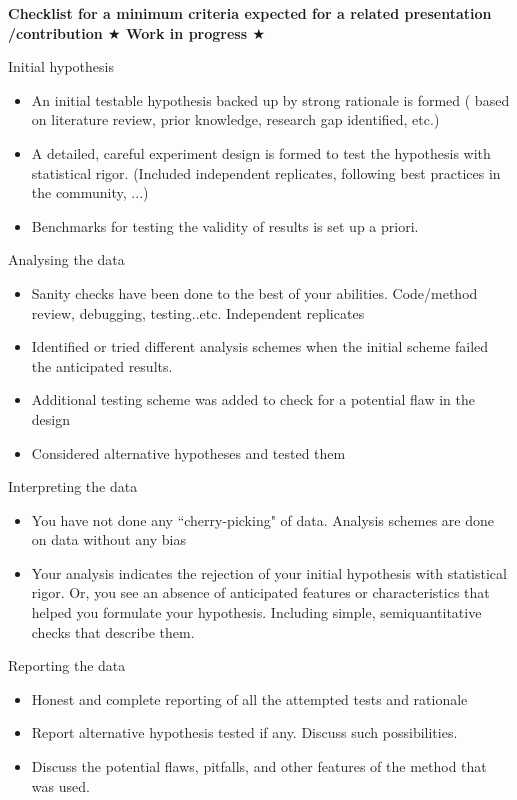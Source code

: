 \documentclass[9pt,lessons]{livecoms}
\theoremstyle{definition}
\theoremstyle{remark}
\begin{document}
\begin{Checklists*}[p!]
\textbf{Checklist for a minimum criteria expected for a related presentation /contribution $\bigstar$ Work in progress $\bigstar$}\\
\begin{checklist}{Initial hypothesis}
\begin{itemize}
\item An initial testable hypothesis backed up by strong rationale is formed ( based on literature review, prior knowledge, research gap identified, etc.)
\item A detailed, careful experiment design is formed to test the hypothesis with statistical rigor.
(Included independent replicates, following best practices in the community, ...) 
\item Benchmarks for testing the validity of results is set up a priori.
\end{itemize}
\end{checklist}

\begin{checklist}{Analysing the data}
\begin{itemize}
\item Sanity checks have been done to the best of your abilities.
Code/method review, debugging, testing..etc. Independent replicates   
\item Identified or tried different analysis schemes when the initial scheme failed the anticipated results.
\item Additional testing scheme was added to check for a potential flaw in the design
\item Considered alternative hypotheses and tested them
\end{itemize}
\end{checklist}

\begin{checklist}{Interpreting the data}
\begin{itemize}
\item You have not done any ``cherry-picking" of data. Analysis schemes are done on data without any bias
\item Your analysis indicates the rejection of your initial hypothesis with statistical rigor.
Or, you see an absence of anticipated features or characteristics that helped you formulate your hypothesis.
Including simple, semiquantitative checks that describe them.
\end{itemize}
\end{checklist}

\begin{checklist}{Reporting the data}
\begin{itemize}
\item Honest and complete reporting of all the attempted tests and rationale
\item Report alternative hypothesis tested if any. Discuss such possibilities.
\item Discuss the potential flaws, pitfalls, and other features of the method that was used.
\end{itemize}
\end{checklist}

\end{Checklists*}
\end{document}
